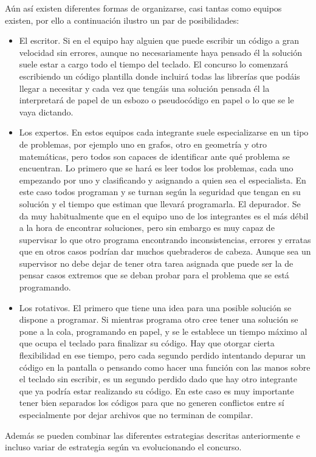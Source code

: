 Aún así existen diferentes formas de organizarse, casi tantas como
equipos existen, por ello a continuación ilustro un par de
posibilidades:
\begin{itemize}
\item El escritor. Si en el equipo hay alguien que puede escribir un
  código a gran velocidad sin errores, aunque no necesariamente haya
  pensado él la solución suele estar a cargo todo el tiempo del
  teclado. El concurso lo comenzará escribiendo un código plantilla
  donde incluirá todas las librerías que podáis llegar a necesitar y
  cada vez que tengáis una solución pensada él la interpretará de
  papel de un esbozo o pseudocódigo en papel o lo que se le vaya
  dictando.

\item Los expertos. En estos equipos cada integrante suele
  especializarse en un tipo de problemas, por ejemplo uno en grafos,
  otro en geometría y otro matemáticas, pero todos son capaces de
  identificar ante qué problema se encuentran. Lo primero que se hará
  es leer todos los problemas, cada uno empezando por uno y
  clasificando y asignando a quien sea el especialista. En este caso
  todos programan y se turnan según la seguridad que tengan en su
  solución y el tiempo que estiman que llevará programarla.  El
  depurador. Se da muy habitualmente que en el equipo uno de los
  integrantes es el más débil a la hora de encontrar soluciones, pero
  sin embargo es muy capaz de supervisar lo que otro programa
  encontrando inconsistencias, errores y erratas que en otros casos
  podrían dar muchos quebraderos de cabeza. Aunque sea un supervisor
  no debe dejar de tener otra tarea asignada que puede ser la de
  pensar casos extremos que se deban probar para el problema que se
  está programando.

\item Los rotativos. El primero que tiene una idea para una posible
  solución se dispone a programar. Si mientras programa otro cree
  tener una solución se pone a la cola, programando en papel, y se le
  establece un tiempo máximo al que ocupa el teclado para finalizar su
  código. Hay que otorgar cierta flexibilidad en ese tiempo, pero cada
  segundo perdido intentando depurar un código en la pantalla o
  pensando como hacer una función con las manos sobre el teclado sin
  escribir, es un segundo perdido dado que hay otro integrante que ya
  podría estar realizando su código. En este caso es muy importante
  tener bien separados los códigos para que no generen conflictos
  entre sí especialmente por dejar archivos que no terminan de
  compilar.
\end{itemize}

Además se pueden combinar las diferentes estrategias descritas
anteriormente e incluso variar de estrategia según va evolucionando el
concurso.
